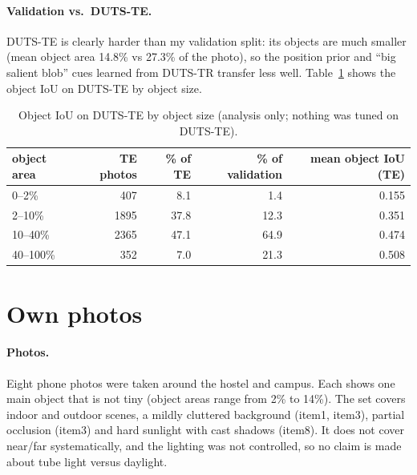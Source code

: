 \documentclass[11pt,a4paper]{article}
\begin{document}
\paragraph{Validation vs.\ DUTS-TE.} DUTS-TE is clearly harder than my validation split: its objects are much smaller (mean object area 14.8\% vs 27.3\% of the photo), so the
position prior and ``big salient blob'' cues learned from DUTS-TR transfer less well. Table~\ref{tab:size} shows the object IoU on DUTS-TE by object size.
\begin{table}[h]\centering\small
\begin{tabular}{lrrrr}\toprule object area & TE photos & \% of TE & \% of validation & mean object IoU (TE) \\\midrule
0--2\% & 407 & 8.1 & 1.4 & 0.155 \\
2--10\% & 1895 & 37.8 & 12.3 & 0.351 \\
10--40\% & 2365 & 47.1 & 64.9 & 0.474 \\
40--100\% & 352 & 7.0 & 21.3 & 0.508 \\
\bottomrule\end{tabular}
\caption{Object IoU on DUTS-TE by object size (analysis only; nothing was tuned on DUTS-TE).}\label{tab:size}\end{table}

\section{Own photos}
\paragraph{Photos.} Eight phone photos were taken around the hostel and campus. Each shows one main object that is not tiny (object areas range from 2\% to 14\%).
The set covers indoor and outdoor scenes, a mildly cluttered background (item1, item3), partial occlusion (item3) and hard sunlight with cast shadows (item8).
It does not cover near/far systematically, and the lighting was not controlled, so no claim is made about tube light versus daylight.
\end{document}
